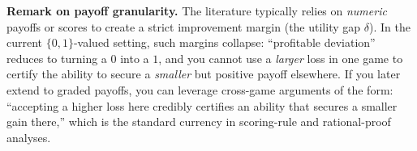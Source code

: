 \medskip
\noindent
\textbf{Remark on payoff granularity.}
The literature typically relies on \emph{numeric} payoffs or scores to create a
strict improvement margin (the utility gap $\delta$). In the current 
$\{0,1\}$-valued setting, such margins collapse: ``profitable deviation'' reduces
to turning a $0$ into a $1$, and you cannot use a \emph{larger} loss in one game
to certify the ability to secure a \emph{smaller} but positive payoff elsewhere.
If you later extend to graded payoffs, you can leverage cross-game arguments of
the form: ``accepting a higher loss here credibly certifies an ability that
secures a smaller gain there,'' which is the standard currency in scoring-rule
and rational-proof analyses.
